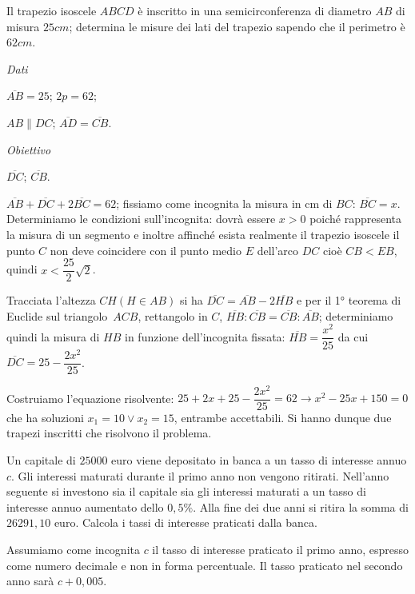\begin{problema}
Il trapezio isoscele $ABCD$ è inscritto in una semicirconferenza di diametro $AB$ di misura $25\unit{cm}$; determina le misure dei lati del trapezio sapendo che il
perimetro è $62\unit{cm}$.
\end{problema}

\begin{multicols}{2}
\emph{Dati}

$\overline {AB} = 25$; $2 p = 62$;

$AB \parallel DC$; $\overline {AD} = \overline {CB}$.

\emph{Obiettivo}

$\overline {DC}$; $ \overline {CB}$.

 
\end{multicols}

\begin{soluzione}
$\overline {AB} + \overline {DC} + 2 \overline {BC} = 62$; fissiamo come incognita la misura in cm di $BC$: $\overline {BC} = x$.
Determiniamo le condizioni sull’incognita: dovrà essere $x > 0$ poiché rappresenta la misura di un segmento e inoltre affinché esista
realmente il trapezio isoscele il punto $C$ non deve coincidere con il punto medio $E$ dell’arco $DC$ cioè $ CB<EB $, quindi $x < \dfrac{25}{2} \sqrt{2}$.

Tracciata l’altezza $CH (H \in AB)$ si ha $\overline {DC} = \overline {AB} - 2 \overline {HB}$ e per il 1° teorema di Euclide sul triangolo~$ACB$, rettangolo in
$C$, $\overline {HB}: \overline {CB} = \overline {CB} : \overline{AB}$; determiniamo quindi la misura di $HB$ in funzione dell’incognita fissata:
$\overline {HB} = \dfrac{x^{2}}{25}$ da cui $\overline {DC} = 25 - \dfrac{2 x^{2}}{25}$.

Costruiamo l’equazione risolvente: $25 + 2 x + 25 - \dfrac{2 x^{2}}{25} = 62 \rightarrow x^{2} - 25 x + 150 = 0$ che ha soluzioni $x_{1} = 10 \vee x_{2} = 15$, entrambe accettabili. Si hanno dunque due trapezi inscritti che risolvono il problema.
\begin{center}
 
\end{center}
\end{soluzione}

\begin{problema}
Un capitale di $25000$ euro viene depositato in banca a un tasso di interesse annuo $c$. Gli interessi maturati durante il primo anno non vengono ritirati.
Nell'anno seguente si investono sia il capitale sia gli interessi maturati a un tasso di interesse annuo aumentato dello $0,5\%$. Alla fine dei due anni si ritira
la somma di $26291,10$ euro. Calcola i tassi di interesse praticati dalla banca.
\end{problema}
Assumiamo come incognita $c$ il tasso di interesse praticato il primo anno, espresso come numero decimale e
non in forma percentuale. Il tasso praticato nel secondo anno sarà $c+0,005$.

